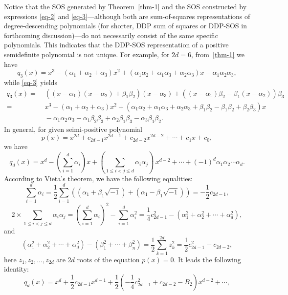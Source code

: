 \documentclass[runningheads]{llncs}
\begin{document}
Notice that the SOS generated by Theorem~\ref{thm-1} and the SOS constructed by expressions \eqref{eq-2} and \eqref{eq-3}---although both are sum-of-squares representations of degree-descending polynomials (for shorter, DDP sum of squares or DDP-SOS in forthcoming discussion)---do not necessarily consist of the same specific polynomials. This indicates that the DDP-SOS representation of a positive semidefinite polynomial is not unique. For example, for $2d=6$, from~\eqref{thm-1} we have
$$
q_3(x)=x^3-(\alpha_1+\alpha_2+\alpha_3)x^2
+(\alpha_1\alpha_2+\alpha_1\alpha_3+\alpha_2\alpha_3)x
-\alpha_1\alpha_2\alpha_3,
$$
while \eqref{eq-3} yields
\begin{align*}
q_3(x)=&\;
\left( (x - \alpha_1)(x - \alpha_2) + \beta_1 \beta_2 \right)(x - \alpha_3) + \left( (x - \alpha_1)\beta_2 - \beta_1 (x - \alpha_2) \right) \beta_3 \\
=&\; x^3-(\alpha_1\!+\!\alpha_2\!+\!\alpha_3)x^2+(\alpha_1\alpha_2\!+\!\alpha_1\alpha_3\!+\!\alpha_2\alpha_3+\beta_1\beta_2\!-\!\beta_1\beta_2\!+\!\beta_2\beta_3)x\\
&\;-\alpha_1\alpha_2\alpha_3-\alpha_1\beta_2\beta_3+\alpha_2\beta_1\beta_3-\alpha_3\beta_1\beta_2.
\end{align*}
In general, for given seimi-positive polynomial 
$$
p(x)=x^{2d}+c_{2d-1}x^{2d-1}+c_{2d-2}x^{2d-2}+\cdots+c_1x+c_0,
$$
we have
$$
q_d(x)=x^d-\left(
\sum_{i=1}^{d}\alpha_i\right)x+
\left(\sum_{1\leq i<j\leq d} \alpha_i\alpha_j \right)\, x^{d-2}+\cdots+
(-1)^d\alpha_1\alpha_2\cdots \alpha_d.
$$
According to Vieta's theorem, we have the following equalities:
$$
\sum_{i=1}^{d}\alpha_i=
\frac{1}{2}\sum_{i=1}^{d}
\left((\alpha_1+\beta_1\sqrt{-1})+(\alpha_1-\beta_1\sqrt{-1})\right)
=-\frac{1}{2}c_{2d-1},
$$
$$
2\times \sum_{1\leq i<j\leq d} \alpha_i\alpha_j=
\left(
\sum_{i=1}^{d}\alpha_i\right)^2-
\sum_{i=1}^{d}\alpha_i^2=\frac{1}{4}c_{2d-1}^2-
(\alpha_1^2+\alpha_2^2+\cdots+\alpha_d^2)
,
$$
and
$$
\left(\alpha_1^2+\alpha_2^2+\cdots+\alpha_d^2\right)
-
\left( \beta_1^2+\cdots+\beta_{n}^2 \right)=
\frac{1}{2}\sum_{k=1}^{2d}z_k^2
=\frac{1}{2}c_{2d-1}^2-c_{2d-2},
$$
here $z_1,z_2,\ldots,z_{2d}$ are $2d$ roots of the equation $p(x)=0$. 
It leads the following identity:
\begin{equation}
 q_d(x)=x^{d}+\frac{1}{2}c_{2d-1}x^{d-1}
 +\frac{1}{2}\left(-\frac{1}{4}c_{2d-1}^2+c_{2d-2}-B_2\right)x^{d-2}+\cdots,
 \label{qdb2}
\end{equation}
\end{document}
